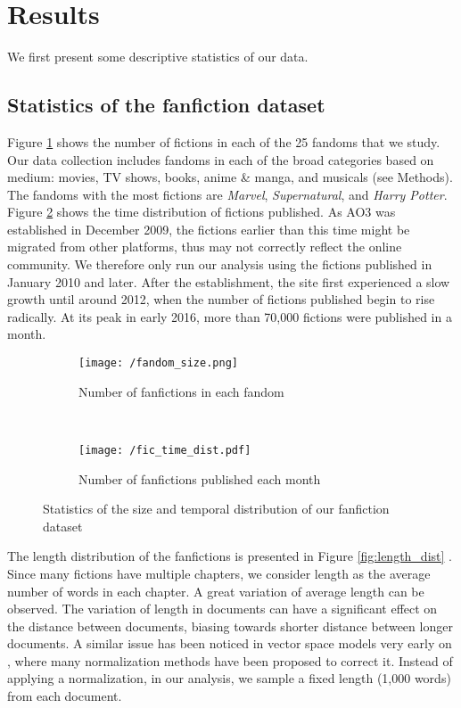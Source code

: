 \documentclass[a4paper]{article}
\begin{document}
\section*{Results} 
We first present some descriptive statistics of our data. 


\subsection*{Statistics of the fanfiction dataset}

Figure \ref{fig:fandom_size} shows the number of fictions in each of the 25 fandoms that we study. Our data collection includes fandoms in each of the broad categories based on medium: movies, TV shows, books, anime \& manga, and musicals (see Methods). The fandoms with the most fictions are \emph{Marvel}, \emph{Supernatural}, and \emph{Harry Potter}. Figure \ref{fig:fic_time_dist}  shows the time distribution of fictions published. As AO3 was established in December 2009, the fictions earlier than this time might be migrated from other platforms, thus may not correctly reflect the online community. We therefore only run our analysis using the fictions published in January 2010 and later. After the establishment, the site first experienced a slow growth until around 2012, when the number of fictions published begin to rise radically. At its peak in early 2016, more than 70,000 fictions were published in a month.


\begin{figure}
    \centering
    \begin{subfigure}[b]{0.7\textwidth}
        \texttt{[image: /fandom\_size.png]}
        \caption{Number of fanfictions in each fandom}
        \label{fig:fandom_size}
    \end{subfigure}
    ~ %
    \begin{subfigure}[b]{0.7\textwidth}
        \texttt{[image: /fic\_time\_dist.pdf]}
        \caption{Number of fanfictions published each month}
        \label{fig:fic_time_dist}
    \end{subfigure}
    \caption{Statistics of the size and temporal distribution of our fanfiction dataset}\label{fig:stats_size_time}
\end{figure}

The length distribution of the fanfictions is presented in Figure \ref{fig:length_dist} . Since many fictions have multiple chapters, we consider length as the average number of words in each chapter. A great variation of average length can be observed. The variation of length in documents can have a significant effect on the distance between documents, biasing towards shorter distance between longer documents. A similar issue has been noticed in vector space models very early on \cite{singhal2017pivoted}, where many normalization methods have been proposed to correct it. Instead of applying a normalization, in our analysis, we sample a fixed length (1,000 words) from each document. 
\end{document}
